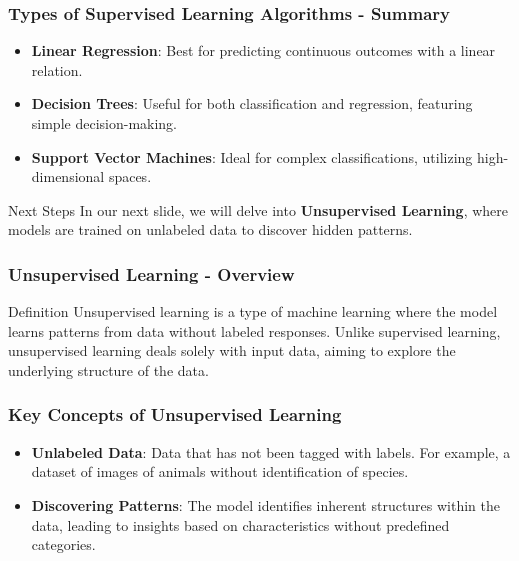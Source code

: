 \documentclass[aspectratio=169]{beamer}
\begin{document}
\begin{frame}[fragile]
    \frametitle{Types of Supervised Learning Algorithms - Summary}
    \begin{itemize}
        \item \textbf{Linear Regression}: Best for predicting continuous outcomes with a linear relation.
        \item \textbf{Decision Trees}: Useful for both classification and regression, featuring simple decision-making.
        \item \textbf{Support Vector Machines}: Ideal for complex classifications, utilizing high-dimensional spaces.
    \end{itemize}
    
    \begin{block}{Next Steps}
        In our next slide, we will delve into \textbf{Unsupervised Learning}, where models are trained on unlabeled data to discover hidden patterns.
    \end{block}
\end{frame}

\begin{frame}[fragile]
  \frametitle{Unsupervised Learning - Overview}
  \begin{block}{Definition}
    Unsupervised learning is a type of machine learning where the model learns patterns from data without labeled responses. Unlike supervised learning, unsupervised learning deals solely with input data, aiming to explore the underlying structure of the data.
  \end{block}
\end{frame}

\begin{frame}[fragile]
  \frametitle{Key Concepts of Unsupervised Learning}
  \begin{itemize}
    \item \textbf{Unlabeled Data}: Data that has not been tagged with labels. For example, a dataset of images of animals without identification of species.
    \item \textbf{Discovering Patterns}: The model identifies inherent structures within the data, leading to insights based on characteristics without predefined categories.
  \end{itemize}
\end{frame}
\end{document}
